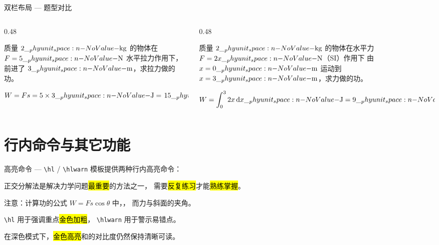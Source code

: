 \documentclass[darkmode=false, randomquote=true, quoteseed=2026, shownav=false,handout=false]{HiBeamer}
\begin{document}
\begin{frame}{双栏布局 --- 题型对比}
  \begin{columns}[T]
    \begin{column}{0.48\linewidth}
      \begin{eg}[恒力作用下]
        质量 $2\Ukg$ 的物体在 $F=5\UN$ 水平拉力作用下，
        前进了 $3\Um$，求拉力做的功。
      \end{eg}

      \begin{solve}
        $W = Fs = 5 \times 3 \UJ= \kern1pt 15\UJ$
      \end{solve}
    \end{column}

    \begin{column}{0.48\linewidth}
      \begin{eg}[变力作用下]
        质量 $2\Ukg$ 的物体在水平力 $F=2x\UN$（SI）作用下
        由 $x=0\Um$ 运动到 $x=3\Um$，求力做的功。
      \end{eg}

      \begin{solve}
        $W = \displaystyle\int_0^3 2x \odif{x} \UJ= 9\UJ$
      \end{solve}
    \end{column}
  \end{columns}
\end{frame}

\section{行内命令与其它功能}

\begin{frame}{高亮命令 --- \texttt{\textbackslash hl} / \texttt{\textbackslash hlwarn}}
  模板提供两种行内高亮命令：

  \vspace{0.5em}
  正交分解法是解决力学问题\hl{最重要}的方法之一，
  需要\hl{反复练习}才能\hl{熟练掌握}。

  \vspace{1em}
  注意：计算功的公式 $W = Fs\cos\theta$ 中，，
  而力与斜面的夹角。

  \vspace{1em}
  \texttt{\textbackslash hl} 用于强调重点{\hl{金色加粗}}，
  \texttt{\textbackslash hlwarn} 用于警示易错点{}。

  \vspace{1em}

  \begin{imp}
    在深色模式下，\hl{金色高亮}和的对比度仍然保持清晰可读。
  \end{imp}
\end{frame}
\end{document}
